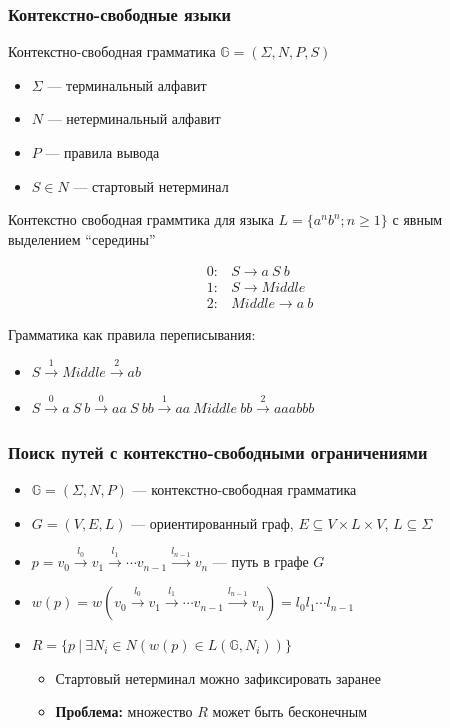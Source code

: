 \documentclass[xcolor=table]{beamer}
\begin{document}
\begin{frame}[fragile]
  \transwipe[direction=90]
  \frametitle{Контекстно-свободные языки}
Контекстно-свободная грамматика $\mathbb{G}=(\Sigma,N,P,S)$ 
  \begin{itemize}
      \item $\Sigma$ --- терминальный алфавит
      \item $N$ --- нетерминальный алфавит
      \item $P$ --- правила вывода
      \item $S \in N$ --- стартовый нетерминал
  \end{itemize}

Контекстно свободная граммтика для языка $L=\{a^n b^n; n \geq 1\}$ с явным выделением ``середины'' \\
\begin{center}
   \[
\begin{array}{rl} 
   0:& S \rightarrow a \ S \ b \\
   1:& S \rightarrow Middle \\
   2:& Middle \rightarrow a \ b
\end{array}
\]
\end{center}

Грамматика как правила переписывания:
 
    \begin{itemize}
        \item $S \xrightarrow{1} Middle \xrightarrow{2} ab$
        \item $S \xrightarrow{0} a\ S\ b \xrightarrow{0} aa\ S\ bb \xrightarrow{1} aa\ Middle\ bb \xrightarrow{2} aaabbb$
    \end{itemize}

\end{frame}

\begin{frame}[fragile]
  \transwipe[direction=90]
  \frametitle{Поиск путей с контекстно-свободными ограничениями}
  \begin{itemize}
  \item $\mathbb{G} = (\Sigma, N, P)$ --- контекстно-свободная грамматика
  \item $G = (V,E,L)$ --- ориентированный граф, $E \subseteq V\times L \times V$, $L\subseteq \Sigma$
  \item $p = v_0 \xrightarrow{l_0} v_1 \xrightarrow{l_1} \cdots v_{n-1}\xrightarrow{l_{n-1}}v_n$ --- путь в графе $G$
  \item $w(p) = w(v_0 \xrightarrow{l_0} v_1 \xrightarrow{l_1} \cdots v_{n-1}\xrightarrow{l_{n-1}}v_n) = l_0 l_1 \cdots l_{n-1}$
  \item $R =\{ p \ | \ \exists N_i \in N (w(p) \in L(\mathbb{G},N_i))\}$
  \begin{itemize}
    \item Стартовый нетерминал можно зафиксировать заранее
    \item \textbf{Проблема:} множество $R$ может быть бесконечным
  \end{itemize}
  \end{itemize}
\end{frame}
\end{document}
